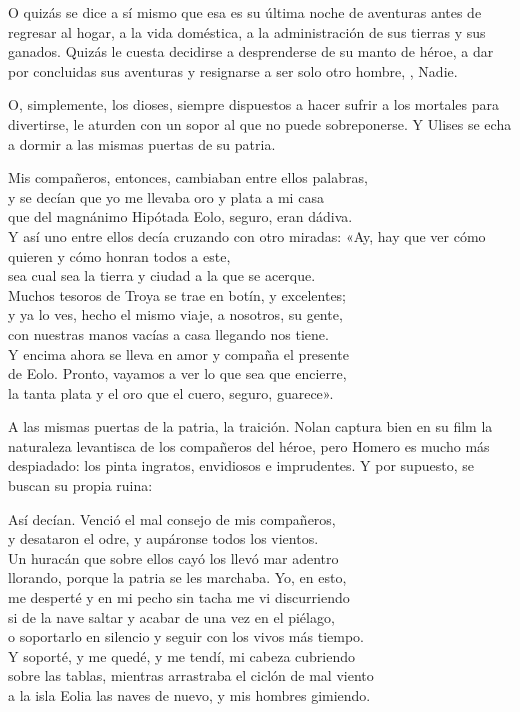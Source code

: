 O quizás se dice a sí mismo que esa es su última noche de aventuras antes de regresar al hogar, a la vida doméstica, a la administración de sus tierras y sus ganados. Quizás le cuesta decidirse a desprenderse de su manto de héroe, a dar por concluidas sus aventuras y resignarse a ser solo otro hombre, , Nadie.

O, simplemente, los dioses, siempre dispuestos a hacer sufrir a los mortales para divertirse, le aturden con un sopor al que no puede sobreponerse. Y Ulises se echa a dormir a las mismas puertas de su patria.

\begin{versocita}
Mis compañeros, entonces, cambiaban entre ellos palabras,\\
y se decían que yo me llevaba oro y plata a mi casa\\
que del magnánimo Hipótada Eolo, seguro, eran dádiva.\\
Y así uno entre ellos decía cruzando con otro miradas:
\stanzabreak
«Ay, hay que ver cómo quieren y cómo honran todos a este,\\
sea cual sea la tierra y ciudad a la que se acerque.\\
Muchos tesoros de Troya se trae en botín, y excelentes;\\
y ya lo ves, hecho el mismo viaje, a nosotros, su gente,\\
con nuestras manos vacías a casa llegando nos tiene.\\
Y encima ahora se lleva en amor y compaña el presente\\
de Eolo. Pronto, vayamos a ver lo que sea que encierre,\\
la tanta plata y el oro que el cuero, seguro, guarece».
\end{versocita}

A las mismas puertas de la patria, la traición. Nolan captura bien en su film la naturaleza levantisca de los compañeros del héroe, pero Homero es mucho más despiadado: los pinta ingratos, envidiosos e imprudentes. Y por supuesto, se buscan su propia ruina:

\begin{versocita}
Así decían. Venció el mal consejo de mis compañeros,\\
y desataron el odre, y aupáronse todos los vientos.\\
Un huracán que sobre ellos cayó los llevó mar adentro\\
llorando, porque la patria se les marchaba. Yo, en esto,\\
me desperté y en mi pecho sin tacha me vi discurriendo\\
si de la nave saltar y acabar de una vez en el piélago,\\
o soportarlo en silencio y seguir con los vivos más tiempo.\\
Y soporté, y me quedé, y me tendí, mi cabeza cubriendo\\
sobre las tablas, mientras arrastraba el ciclón de mal viento\\
a la isla Eolia las naves de nuevo, y mis hombres gimiendo.
\end{versocita}

